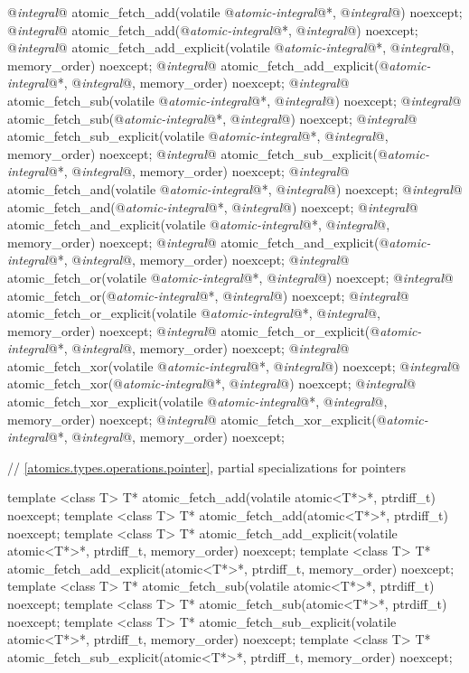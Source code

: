\begin{codeblock}
{  @\textit{integral}@ atomic_fetch_add(volatile @\textit{atomic-integral}@*, @\textit{integral}@) noexcept;
  @\textit{integral}@ atomic_fetch_add(@\textit{atomic-integral}@*, @\textit{integral}@) noexcept;
  @\textit{integral}@ atomic_fetch_add_explicit(volatile @\textit{atomic-integral}@*, @\textit{integral}@, memory_order) noexcept;
  @\textit{integral}@ atomic_fetch_add_explicit(@\textit{atomic-integral}@*, @\textit{integral}@, memory_order) noexcept;
  @\textit{integral}@ atomic_fetch_sub(volatile @\textit{atomic-integral}@*, @\textit{integral}@) noexcept;
  @\textit{integral}@ atomic_fetch_sub(@\textit{atomic-integral}@*, @\textit{integral}@) noexcept;
  @\textit{integral}@ atomic_fetch_sub_explicit(volatile @\textit{atomic-integral}@*, @\textit{integral}@, memory_order) noexcept;
  @\textit{integral}@ atomic_fetch_sub_explicit(@\textit{atomic-integral}@*, @\textit{integral}@, memory_order) noexcept;
  @\textit{integral}@ atomic_fetch_and(volatile @\textit{atomic-integral}@*, @\textit{integral}@) noexcept;
  @\textit{integral}@ atomic_fetch_and(@\textit{atomic-integral}@*, @\textit{integral}@) noexcept;
  @\textit{integral}@ atomic_fetch_and_explicit(volatile @\textit{atomic-integral}@*, @\textit{integral}@, memory_order) noexcept;
  @\textit{integral}@ atomic_fetch_and_explicit(@\textit{atomic-integral}@*, @\textit{integral}@, memory_order) noexcept;
  @\textit{integral}@ atomic_fetch_or(volatile @\textit{atomic-integral}@*, @\textit{integral}@) noexcept;
  @\textit{integral}@ atomic_fetch_or(@\textit{atomic-integral}@*, @\textit{integral}@) noexcept;
  @\textit{integral}@ atomic_fetch_or_explicit(volatile @\textit{atomic-integral}@*, @\textit{integral}@, memory_order) noexcept;
  @\textit{integral}@ atomic_fetch_or_explicit(@\textit{atomic-integral}@*, @\textit{integral}@, memory_order) noexcept;
  @\textit{integral}@ atomic_fetch_xor(volatile @\textit{atomic-integral}@*, @\textit{integral}@) noexcept;
  @\textit{integral}@ atomic_fetch_xor(@\textit{atomic-integral}@*, @\textit{integral}@) noexcept;
  @\textit{integral}@ atomic_fetch_xor_explicit(volatile @\textit{atomic-integral}@*, @\textit{integral}@, memory_order) noexcept;
  @\textit{integral}@ atomic_fetch_xor_explicit(@\textit{atomic-integral}@*, @\textit{integral}@, memory_order) noexcept;

  // \ref{atomics.types.operations.pointer}, partial specializations for pointers

  template <class T>
    T* atomic_fetch_add(volatile atomic<T*>*, ptrdiff_t) noexcept;
  template <class T>
    T* atomic_fetch_add(atomic<T*>*, ptrdiff_t) noexcept;
  template <class T>
    T* atomic_fetch_add_explicit(volatile atomic<T*>*, ptrdiff_t, memory_order) noexcept;
  template <class T>
    T* atomic_fetch_add_explicit(atomic<T*>*, ptrdiff_t, memory_order) noexcept;
  template <class T>
    T* atomic_fetch_sub(volatile atomic<T*>*, ptrdiff_t) noexcept;
  template <class T>
    T* atomic_fetch_sub(atomic<T*>*, ptrdiff_t) noexcept;
  template <class T>
    T* atomic_fetch_sub_explicit(volatile atomic<T*>*, ptrdiff_t, memory_order) noexcept;
  template <class T>
    T* atomic_fetch_sub_explicit(atomic<T*>*, ptrdiff_t, memory_order) noexcept;

}
\end{codeblock}
